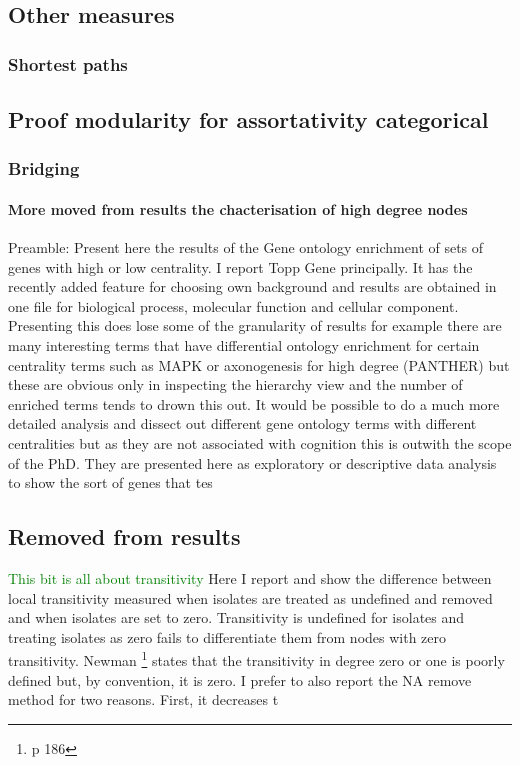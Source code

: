 \subsection{Other measures}
\subsubsection{Shortest paths}

\subsection{Proof modularity for assortativity categorical}

\subsubsection{Bridging}

\cite{valente2010bridging}
\paragraph{More moved from results the chacterisation of high degree nodes}

Preamble: Present here the results of the Gene ontology enrichment of sets of genes with high or low centrality. I report Topp Gene principally. It has the recently added feature for choosing own background and results are obtained in one file for biological process, molecular function and cellular component. Presenting this does lose some of the granularity of results for example there are many interesting terms that have differential ontology enrichment for certain centrality terms such as MAPK or axonogenesis for high degree (PANTHER) but these are obvious only in inspecting the hierarchy view and the number of enriched terms tends to drown this out. It would be possible to do a much more detailed analysis and dissect out different gene ontology terms with different centralities but as they are not associated with cognition this is outwith the scope of the PhD. They are presented here as exploratory or descriptive data analysis to show the sort of genes that tes
\subsection{Removed from results}
\textcolor{green}{This bit is all about transitivity} Here I report and show the difference between local transitivity measured when isolates are treated as undefined and removed and when isolates are set to zero.  Transitivity is undefined for isolates and treating isolates as zero fails to differentiate them from nodes with zero transitivity. Newman \cite{newman2018networks} \footnote{p 186} states that the transitivity in degree zero or one is poorly defined but, by convention, it is zero. I prefer to also report the NA remove method for two reasons. First, it decreases t





